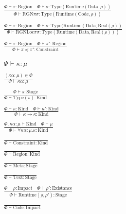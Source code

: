 \documentclass {article}
\begin{document}
\begin{gather*}
\\
\frac
{\Phi \vdash \pi : \text{Region} \quad \Phi \vdash \sigma : \text{Type}(\text{Runtime}(\text{Data}, \rho))}
{\Phi \vdash \text{RGN} \pi \sigma : \text{Type}(\text{Runtime}(\text{Code}, \rho))} \\
\\
\frac
{\Phi \vdash \pi : \text{Region} \quad \Phi \vdash \sigma : \text{Type}(\text{Runtime}(\text{Data}, \text{Real}(\rho))}
{\Phi \vdash \text{RGNLoc} \pi \sigma : \text{Type}(\text{Runtime} (\text{Data}, \text{Real}(\rho)))} \\
\\
\frac
{\Phi \vdash \pi : \text{Region} \quad \Phi \vdash \pi' : \text{Region}}
{\Phi \vdash \pi \preceq \pi' : \text{Constraint}}
\\
\\
\\
\Phi \vdash \kappa : \mu \tag*{[Kind Validation]} \\
\\
\frac
{(\kappa \alpha : \mu) \in \Phi}
{\Phi \vdash \kappa \alpha : \mu } \\
\\
\frac
{\Phi \vdash s : \text{Stage}}
{\Phi \vdash \text {Type} (s) : \text{Kind}} \\
\\
\frac
{\Phi \vdash \kappa : \text{Kind} \quad \Phi \vdash \kappa' : \text{Kind}}
{\Phi \vdash \kappa \to \kappa : \text{Kind} } \\
\\
\frac
{\Phi, \kappa \alpha : \mu \vdash \text{Kind} \quad \Phi \vdash \mu }
{\Phi \vdash \forall \kappa \alpha : \mu. \kappa : \text{Kind}  } \\
\\
\frac
{}
{\Phi \vdash \text{Constraint} : \text{Kind}} \\
\\
\frac
{}
{\Phi \vdash \text{Region} : \text{Kind}} \\
\\
\frac
{}
{\Phi \vdash \text{Meta} : \text{Stage}} \\
\\
\frac
{}
{\Phi \vdash \text{Text} : \text{Stage}} \\
\\
\frac
{\Phi \vdash \rho : \text{Impact} \quad \Phi \vdash \rho' : \text{Existance}}
{\Phi \vdash \text{Runtime} (\rho, \rho') : \text{Stage}} \\
\\
\frac
{}
{\Phi \vdash \text{Code} : \text{Impact}} \\

\end{gather*}
\end{document}
